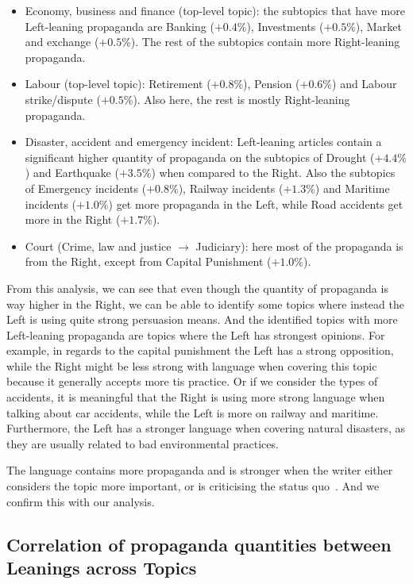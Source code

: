 \begin{itemize}
    \item Economy, business and finance (top-level topic): the subtopics that have more Left-leaning propaganda  are Banking ($+0.4\%$), Investments ($+0.5\%$), Market and exchange ($+0.5\%$). The rest of the subtopics contain more Right-leaning propaganda.
    \item Labour (top-level topic): Retirement ($+0.8\%$), Pension ($+0.6\%$) and Labour strike/dispute ($+0.5\%$). Also here, the rest is mostly Right-leaning propaganda.
    \item Disaster, accident and emergency incident: Left-leaning articles contain a significant higher quantity of propaganda on the subtopics of Drought ($+4.4\%$) and Earthquake ($+3.5\%$) when compared to the Right. Also the subtopics of Emergency incidents ($+0.8\%$), Railway incidents ($+1.3\%$) and Maritime incidents ($+1.0\%$) get more propaganda in the Left, while Road accidents get more in the Right ($+1.7\%$).
    \item Court (Crime, law and justice $\rightarrow$ Judiciary): here most of the propaganda is from the Right, except from Capital Punishment ($+1.0\%$).
\end{itemize}

From this analysis, we can see that even though the quantity of propaganda is way higher in the Right, we can be able to identify some topics where instead the Left is using quite strong persuasion means.
And the identified topics with more Left-leaning propaganda are topics where the Left has strongest opinions. For example, in regards to the capital punishment the Left has a strong opposition, while the Right might be less strong with language when covering this topic because it generally accepts more tis practice.
Or if we consider the types of accidents, it is meaningful that the Right is using more strong language when talking about car accidents, while the Left is more on railway and maritime. Furthermore, the Left has a stronger language when covering natural disasters, as they are usually related to bad environmental practices.

The language contains more propaganda and is stronger when the writer either considers the topic more important, or is criticising the status quo~\citep{rose1992political}. And we confirm this with our analysis.  


\subsection{\statusgreen Correlation of propaganda quantities between Leanings across Topics}
\label{ssec:topic_propaganda_leaning_tech_quantities}

